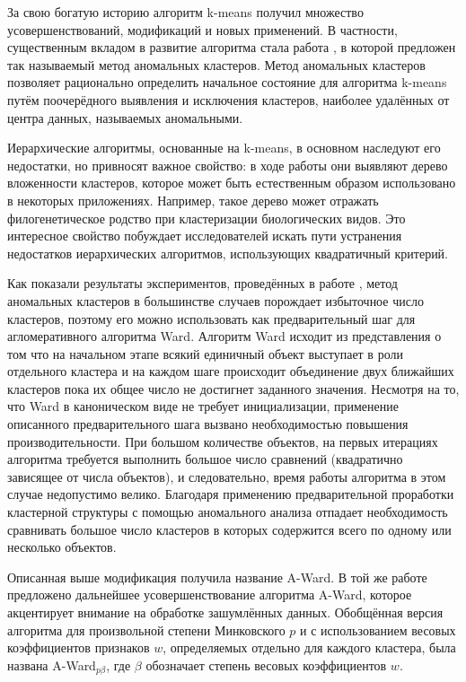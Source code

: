 \documentclass[12pt]{a&t}
\begin{document}
За свою богатую историю алгоритм \mbox{k-means} получил множество усовершенствований, модификаций и новых применений. В частности, существенным вкладом в развитие алгоритма стала работа \cite{Anomalous-Clustring}, в которой предложен так называемый метод аномальных кластеров. Метод аномальных кластеров позволяет рационально определить начальное состояние для алгоритма \mbox{k-means} путём поочерёдного выявления и исключения кластеров, наиболее удалённых от центра данных, называемых аномальными. 

Иерархические алгоритмы, основанные на \mbox{k-means}, в основном наследуют его недостатки, но привносят важное свойство: в ходе работы они выявляют дерево вложенности кластеров, которое может быть естественным образом использовано в некоторых приложениях. Например, такое дерево может отражать  филогенетическое родство при кластеризации биологических видов. Это интересное свойство побуждает исследователей искать пути устранения недостатков иерархических алгоритмов, использующих квадратичный критерий. 

Как показали результаты экспериментов, проведённых в работе \cite{Amorim-Makarenkov-Mirkin}, метод аномальных кластеров в большинстве случаев порождает избыточное число кластеров, поэтому его можно использовать как предварительный шаг для агломеративного алгоритма Ward. Алгоритм Ward исходит из представления о том что на начальном этапе всякий единичный объект выступает в роли отдельного кластера и на каждом шаге происходит объединение двух ближайших кластеров пока их общее число не достигнет заданного значения.  Несмотря на то, что Ward в каноническом виде не требует инициализации, применение описанного предварительного шага вызвано необходимостью повышения производительности. При большом количестве объектов, на первых итерациях алгоритма требуется выполнить большое число сравнений (квадратично зависящее от числа объектов), и следовательно, время работы алгоритма в этом случае недопустимо велико. Благодаря применению предварительной проработки кластерной структуры с помощью аномального анализа отпадает необходимость сравнивать большое число кластеров в которых содержится всего по одному или несколько объектов. 

Описанная выше модификация получила название \mbox{A-Ward}. В той же работе \cite{Amorim-Makarenkov-Mirkin} предложено дальнейшее усовершенствование алгоритма \mbox{A-Ward}, которое акцентирует внимание на обработке зашумлённых данных. Обобщённая версия алгоритма для произвольной степени Минковского $ p $ и с использованием весовых коэффициентов признаков $ w $, определяемых отдельно для каждого кластера, была названа \mbox{A-Ward$ _{p\beta} $}, где $ \beta $ обозначает степень весовых коэффициентов $ w $.
\end{document}
